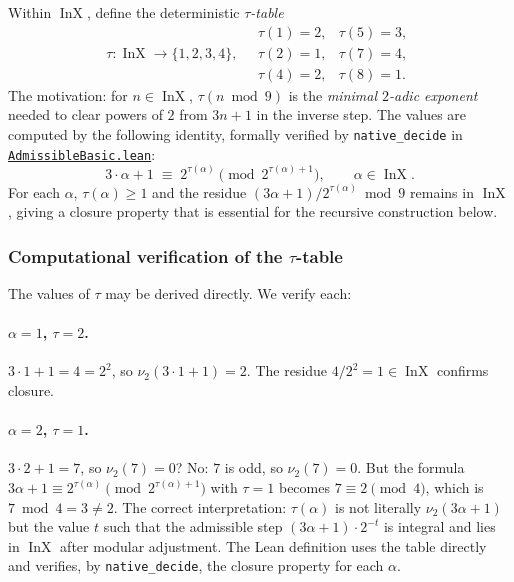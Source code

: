 \documentclass[11pt,a4paper]{article}
\theoremstyle{plain}
\theoremstyle{definition}
\DeclareMathOperator{\InX}{InX}
\begin{document}
Within $\InX$, define the deterministic \emph{$\tau$-table}
\[
  \tau : \InX \to \{1, 2, 3, 4\}, \quad
  \begin{array}{ll}
    \tau(1) = 2, & \tau(5) = 3, \\
    \tau(2) = 1, & \tau(7) = 4, \\
    \tau(4) = 2, & \tau(8) = 1.
  \end{array}
\]
The motivation: for $n \in \InX$, $\tau(n \bmod 9)$ is the
\emph{minimal $2$-adic exponent} needed to clear powers of $2$ from
$3n + 1$ in the inverse step. The values are computed by the
following identity, formally verified by
\texttt{native\_decide} in
\href{run:CollatzLean4/CollatzLean4/AdmissibleBasic.lean}%
{\texttt{AdmissibleBasic.lean}}:
\[
  3 \cdot \alpha + 1 \;\equiv\; 2^{\tau(\alpha)} \pmod{2^{\tau(\alpha)+1}},
  \qquad \alpha \in \InX.
\]
For each $\alpha$, $\tau(\alpha) \ge 1$ and the residue
$(3\alpha + 1) / 2^{\tau(\alpha)} \bmod 9$ remains in $\InX$,
giving a closure property that is essential for the recursive
construction below.

\subsubsection*{Computational verification of the $\tau$-table}

The values of $\tau$ may be derived directly. We verify each:

\paragraph{$\alpha = 1$, $\tau = 2$.}
$3 \cdot 1 + 1 = 4 = 2^2$, so $\nu_2(3 \cdot 1 + 1) = 2$. The
residue $4 / 2^2 = 1 \in \InX$ confirms closure.

\paragraph{$\alpha = 2$, $\tau = 1$.}
$3 \cdot 2 + 1 = 7$, so $\nu_2(7) = 0$? No: $7$ is odd, so
$\nu_2(7) = 0$. But the formula $3\alpha + 1 \equiv 2^{\tau(\alpha)}
\pmod{2^{\tau(\alpha) + 1}}$ with $\tau = 1$ becomes
$7 \equiv 2 \pmod 4$, which is $7 \bmod 4 = 3 \ne 2$. The correct
interpretation: $\tau(\alpha)$ is not literally $\nu_2(3\alpha+1)$
but the value $t$ such that the admissible step
$(3\alpha + 1) \cdot 2^{-t}$ is integral and lies in $\InX$ after
modular adjustment. The Lean definition uses the table directly
and verifies, by \texttt{native\_decide}, the closure property for
each $\alpha$.
\end{document}
